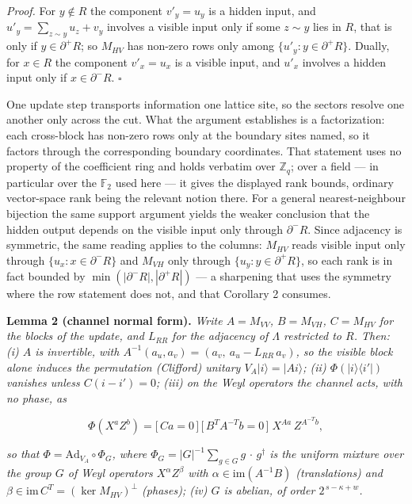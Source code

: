 \documentclass[
]{article}
\begin{document}
\emph{Proof.} For \(y \notin R\) the component \(v'_y = u_y\) is a
hidden input, and \(u'_y = \sum_{z \sim y} u_z + v_y\) involves a
visible input only if some \(z \sim y\) lies in \(R\), that is only if
\(y \in \partial^{+}R\); so \(M_{HV}\) has non-zero rows only among
\(\{u'_y : y \in \partial^{+}R\}\). Dually, for \(x \in R\) the
component \(v'_x = u_x\) is a visible input, and \(u'_x\) involves a
hidden input only if \(x \in \partial^{-}R\). \(\square\)

One update step transports information one lattice site, so the sectors
resolve one another only across the cut. What the argument establishes
is a factorization: each cross-block has non-zero rows only at the
boundary sites named, so it factors through the corresponding boundary
coordinates. That statement uses no property of the coefficient ring and
holds verbatim over \(\mathbb{Z}_q\); over a field --- in particular
over the \(\mathbb{F}_2\) used here --- it gives the displayed rank
bounds, ordinary vector-space rank being the relevant notion there. For
a general nearest-neighbour bijection the same support argument yields
the weaker conclusion that the hidden output depends on the visible
input only through \(\partial^{-}R\). Since adjacency is symmetric, the
same reading applies to the columns: \(M_{HV}\) reads visible input only
through \(\{u_x : x \in \partial^{-}R\}\) and \(M_{VH}\) only through
\(\{u_y : y \in \partial^{+}R\}\), so each rank is in fact bounded by
\(\min(|\partial^{-}R|, |\partial^{+}R|)\) --- a sharpening that uses
the symmetry where the row statement does not, and that Corollary 2
consumes.

\textbf{Lemma 2 (channel normal form).} \emph{Write \(A = M_{VV}\),
\(B = M_{VH}\), \(C = M_{HV}\) for the blocks of the update, and
\(L_{RR}\) for the adjacency of \(\Lambda\) restricted to \(R\). Then:
(i) \(A\) is invertible, with
\(A^{-1}(a_u, a_v) = (a_v,\ a_u - L_{RR}\,a_v)\), so the visible block
alone induces the permutation (Clifford) unitary
\(V_A|i\rangle = |Ai\rangle\); (ii) \(\Phi(|i\rangle\langle i'|)\)
vanishes unless \(C(i - i') = 0\); (iii) on the Weyl operators the
channel acts, with no phase, as}

\[\Phi\!\left(X^{a}Z^{b}\right) = \big[\,Ca = 0\,\big]\,\big[\,B^{T}A^{-T}b = 0\,\big]\; X^{Aa}\,Z^{A^{-T}b},\]

\emph{so that \(\Phi = \mathrm{Ad}_{V_A} \circ \Phi_G\), where
\(\Phi_G = |G|^{-1} \sum_{g \in G} g\,\cdot\,g^{\dagger}\) is the
uniform mixture over the group \(G\) of Weyl operators
\(X^{\alpha}Z^{\beta}\) with \(\alpha \in \mathrm{im}(A^{-1}B)\)
(translations) and
\(\beta \in \mathrm{im}\,C^{T} = (\ker M_{HV})^{\perp}\) (phases); (iv)
\(G\) is abelian, of order \(2^{\,s - \kappa + w}\).}
\end{document}
